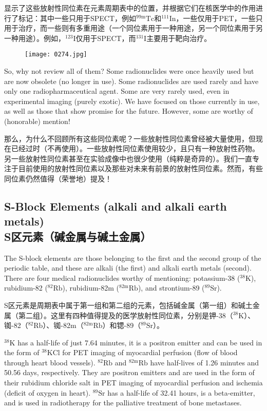 \documentclass[dvipsnames, svgnames,a4paper,11pt]{article}
\begin{document}
显示了这些放射性同位素在元素周期表中的位置，并根据它们在核医学中的作用进行了标记：其中一些只用于SPECT，例如\(\mathrm{^{99m}Tc}\)和\(\mathrm{^{111}In}\)，一些仅用于PET，一些只用于治疗，而一些则有多重用途（一个同位素用于一种用途，另一个同位素用于另一种用途）。例如，\(\mathrm{^{123}I}\)仅用于SPECT，而\(\mathrm{^{131}I}\)主要用于靶向治疗。

\begin{figure}[h]
	\centering
    \texttt{[image: 0274.jpg]}  
     \label{fig371}
\end{figure}

So, why not review all of them? Some radionuclides were once heavily used but are now obsolete (no longer in use). Some radionuclides are used rarely and have only one radiopharmaceutical agent. Some are very rarely used, even in experimental imaging (purely exotic). We have focused on those currently in use, as well as those that show promise for the future. However, some are worthy of (honorable) mention!

那么，为什么不回顾所有这些同位素呢？一些放射性同位素曾经被大量使用，但现在已经过时（不再使用）。一些放射性同位素使用较少，且只有一种放射性药物。另一些放射性同位素甚至在实验成像中也很少使用（纯粹是奇异的）。我们一直专注于目前使用的放射性同位素以及那些对未来有前景的放射性同位素。然而，有些同位素仍然值得（荣誉地）提及！

\subsection{S-Block Elements (alkali and alkali earth metals) \\S区元素（碱金属与碱土金属）}  

The S-block elements are those belonging to the first and the second group of the periodic table, and these are alkali (the first) and alkali earth metals (second). There are four medical radionuclides worthy of mentioning: potassium-38 (\(\mathrm{^{38}K}\)), rubidium-82 (\(\mathrm{^{82}Rb}\)), rubidium-82m (\(\mathrm{^{82m}Rb}\)), and strontium-89 (\(\mathrm{^{89}Sr}\)).

S区元素是周期表中属于第一组和第二组的元素，包括碱金属（第一组）和碱土金属（第二组）。这里有四种值得提及的医学放射性同位素，分别是钾-38（\(\mathrm{^{38}K}\)）、铷-82（\(\mathrm{^{82}Rb}\)）、铷-82m（\(\mathrm{^{82m}Rb}\)）和锶-89（\(\mathrm{^{89}Sr}\)）。

\(\mathrm{^{38}K}\) has a half-life of just 7.64 minutes, it is a positron emitter and can be used in the form of \(\mathrm{^{38}KCl}\) for PET imaging of myocardial perfusion (flow of blood through heart blood vessels). \(\mathrm{^{82}Rb}\) and \(\mathrm{^{82m}Rb}\) have half-lives of 1.26 minutes and 50.56 days, respectively. They are positron emitters and are used in the form of their rubidium chloride salt in PET imaging of myocardial perfusion and ischemia (deficit of oxygen in heart). \(\mathrm{^{89}Sr}\) has a half-life of 32.41 hours, is a beta-emitter, and is used in radiotherapy for the palliative treatment of bone metastases.
\end{document}
